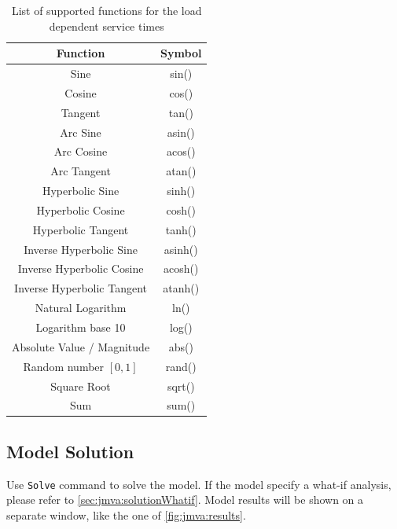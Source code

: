 \begin{table}[htbp]
\begin{center}
\begin{tabular}{|c|c|}
Function & Symbol\\
\hline
Sine & sin()\\
Cosine & cos()\\
Tangent & tan()\\
Arc Sine & asin()\\
Arc Cosine & acos()\\
Arc Tangent & atan()\\
Hyperbolic Sine & sinh()\\
Hyperbolic Cosine & cosh()\\
Hyperbolic Tangent & tanh()\\
Inverse Hyperbolic Sine & asinh()\\
Inverse Hyperbolic Cosine & acosh()\\
Inverse Hyperbolic Tangent & atanh()\\
Natural Logarithm & ln()\\
Logarithm base 10 & log()\\
Absolute Value / Magnitude & abs()\\
Random number $[0,1]$ & rand()\\
Square Root & sqrt()\\
Sum & sum()\\
\hline
\end{tabular}
\end{center}
\caption{List of supported functions for the load dependent service
times} \label{tab:jmva:Functions}
\end{table}

\subsection{Model Solution}
\label{sec:jmva:solution}Use \texttt{Solve} command to solve the
model. If the model specify a what-if analysis, please refer to
\autoref{sec:jmva:solutionWhatif}. Model results will be shown on a
separate window, like the one of \autoref{fig:jmva:results}.

